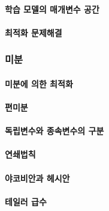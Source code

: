 \documentclass [12pt] {oblivoir}
\let\oldsubsubsection=\subsubsection
\renewcommand{\subsubsection}
{
  \filbreak
  \oldsubsubsection
}
\begin{document}
\paragraph*{학습 모델의 매개변수 공간}\mbox{}

\vspace{3mm}

\paragraph*{최적화 문제해결}\mbox{}

\vspace{3mm}

\subsubsection{미분}

\paragraph*{미분에 의한 최적화}\mbox{}

\vspace{3mm}

\paragraph*{편미분}\mbox{}

\vspace{3mm}

\paragraph*{독립변수와 종속변수의 구분}\mbox{}

\vspace{3mm}

\paragraph*{연쇄법칙}\mbox{}

\vspace{3mm}

\paragraph*{야코비안과 헤시안}\mbox{}

\vspace{3mm}

\paragraph*{테일러 급수}\mbox{}
\end{document}

